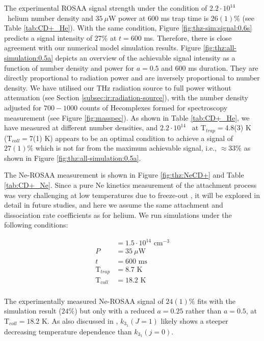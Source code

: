 
The experimental ROSAA signal strength under the condition of $2.2 \cdot 10^{14}$
\percc\ helium number density and $35\ \mu$W power at 600 ms trap time is
$26(1)$\% (see Table \ref{tab:CD+_He}). With the same condition, Figure
\ref{fig:thz-sim:signal:0.6s} predicts a signal intensity of 27\% at $t=600$ ms.
Therefore, there is close agreement with our numerical model simulation
results. Figure \ref{fig:thz:all-simulation:0.5a} depicts an overview of the
achievable signal intensity as a function of number density and power for $a=0.5$
and 600 ms duration. They are directly proportional to radiation power and are
inversely proportional to number density. We have utilised our THz radiation
source to full power without attenuation (see Section
\ref{subsec:ir:radiation-source}), with the number density adjusted for
$700-1000$ counts of He\CD complexes formed for spectroscopy measurement (see
Figure \ref{fig:masspec}). As shown in Table \ref{tab:CD+_He}, we have measured
at different number densities, and $2.2 \cdot 10^{14}$ \percc\ at
T$_{trap}=$4.8(3) K (T$_{coll}=$7(1) K) appears to be an optimal condition to
achieve a signal of $27(1) \%$ which is not far from the maximum achievable
signal, i.e., $\approx 33 \%$ as shown in Figure
\ref{fig:thz:all-simulation:0.5a}.

The Ne-ROSAA measurement is shown in Figure \ref{fig:thz:NeCD+} and Table
\ref{tab:CD+_Ne}. Since a pure Ne kinetics measurement of the attachment process was very challenging at
low temperatures due to freeze-out , it will be explored in detail in future
studies, and here we assume the same attachment and dissociation rate
coefficients as for helium. We run simulations under the following conditions:

\begin{align*}
    [Ne]            & = 1.5 \cdot 10^{14} \text{ cm}^{-3} \\
    P               & = 35\ \mu \text{W}                  \\
    t               & = 600 \text{ ms}                    \\
    \text{T}_{trap} & = 8.7 \text{ K}                     \\
    \text{T}_{coll} & = 18.2 \text{ K}                    \\
\end{align*}

The experimentally measured Ne-ROSAA signal of $24(1) \%$ fits with the
simulation result ($24 \%$) but only with a reduced $a=0.25$ rather than $a=0.5$,
at T$_{coll}=18.2$ K. As also discussed in \citet{Brunken2017}, $k_{3_1}(J=1)$
likely shows a steeper decreasing temperature dependence than $k_{3_1}(j=0)$.\\

